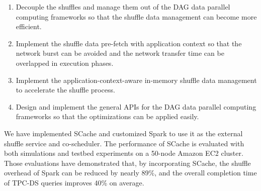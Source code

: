 \begin{englishabstract}
\begin{enumerate}
    \item Decouple the shuffles and manage them out of the DAG data parallel computing frameworks so that the shuffle data management can become more efficient.
    \item Implement the shuffle data pre-fetch with application context so that the network burst can be avoided and the network transfer time can be overlapped in execution phases.
    \item Implement the application-context-aware in-memory shuffle data management to accelerate the shuffle process.
    \item Design and implement the general APIs for the DAG data parallel computing frameworks so that the optimizations can be applied easily.
\end{enumerate}

We have implemented SCache and customized Spark to use it as the external shuffle service and co-scheduler. 
The performance of SCache is evaluated with both simulations and testbed experiments on a 50-node Amazon EC2 cluster.
Those evaluations have demonstrated that, by incorporating SCache, the shuffle overhead of Spark can be reduced by nearly 89\%, 
and the overall completion time of TPC-DS queries improves 40\% on average.


\end{englishabstract}

